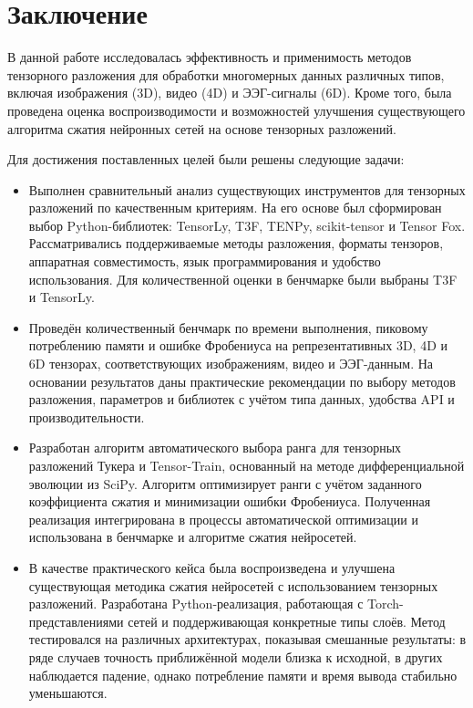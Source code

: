 \chapter{Заключение}
\label{chap:conclusion}

В данной работе исследовалась эффективность и применимость методов тензорного разложения для обработки многомерных данных различных типов, включая изображения (3D), видео (4D) и ЭЭГ-сигналы (6D). Кроме того, была проведена оценка воспроизводимости и возможностей улучшения существующего алгоритма сжатия нейронных сетей на основе тензорных разложений.

Для достижения поставленных целей были решены следующие задачи:

\begin{itemize}
    \item Выполнен сравнительный анализ существующих инструментов для тензорных разложений по качественным критериям. На его основе был сформирован выбор Python-библиотек: TensorLy, T3F, TENPy, scikit-tensor и Tensor Fox. Рассматривались поддерживаемые методы разложения, форматы тензоров, аппаратная совместимость, язык программирования и удобство использования. Для количественной оценки в бенчмарке были выбраны T3F и TensorLy.
    
    \item Проведён количественный бенчмарк по времени выполнения, пиковому потреблению памяти и ошибке Фробениуса на репрезентативных 3D, 4D и 6D тензорах, соответствующих изображениям, видео и ЭЭГ-данным. На основании результатов даны практические рекомендации по выбору методов разложения, параметров и библиотек с учётом типа данных, удобства API и производительности.
    
    \item Разработан алгоритм автоматического выбора ранга для тензорных разложений Тукера и Tensor-Train, основанный на методе дифференциальной эволюции из SciPy. Алгоритм оптимизирует ранги с учётом заданного коэффициента сжатия и минимизации ошибки Фробениуса. Полученная реализация интегрирована в процессы автоматической оптимизации и использована в бенчмарке и алгоритме сжатия нейросетей.
    
    \item В качестве практического кейса была воспроизведена и улучшена существующая методика сжатия нейросетей с использованием тензорных разложений. Разработана Python-реализация, работающая с Torch-представлениями сетей и поддерживающая конкретные типы слоёв. Метод тестировался на различных архитектурах, показывая смешанные результаты: в ряде случаев точность приближённой модели близка к исходной, в других наблюдается падение, однако потребление памяти и время вывода стабильно уменьшаются.
\end{itemize}

